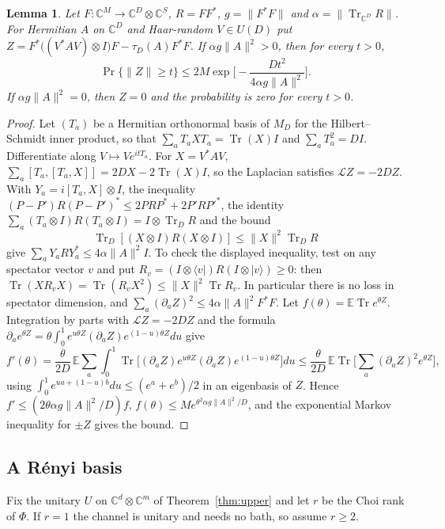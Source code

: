 \documentclass[11pt,a4paper]{article}
\theoremstyle{plain}
\newtheorem{lemma}[theorem]{Lemma}
\theoremstyle{definition}
\theoremstyle{remark}
\DeclareMathOperator{\Tr}{Tr}
\begin{document}
\begin{lemma}\label{lem:concentration}
Let $F:\mathbb{C}^{M}\to\mathbb{C}^D\otimes\mathbb{C}^S$, $R=FF^*$, $g=\|F^*F\|$ and $\alpha=\|\Tr_{\mathbb{C}^D}R\|$. For
Hermitian $A$ on $\mathbb{C}^D$ and Haar-random $V\in U(D)$ put
$Z=F^*\big((V^*AV)\otimes I\big)F-\tau_D(A)F^*F$. If $\alpha g\|A\|^2>0$, then for every $t>0$,
\[
\Pr\{\|Z\|\ge t\}\le2M\exp\!\Big[-\frac{Dt^2}{4\alpha g\|A\|^2}\Big].
\]
If $\alpha g\|A\|^2=0$, then $Z=0$ and the probability is zero for every $t>0$.
\end{lemma}

\begin{proof}
Let $(T_a)$ be a Hermitian orthonormal basis of $M_D$ for the Hilbert--Schmidt inner product, so that
$\sum_aT_aXT_a=\Tr(X)I$ and $\sum_aT_a^2=DI$. Differentiate along $V\mapsto Ve^{itT_a}$. For $X=V^*AV$,
$\sum_a[T_a,[T_a,X]]=2DX-2\Tr(X)I$, so the Laplacian satisfies $\mathcal{L}Z=-2DZ$. With $Y_a=i[T_a,X]\otimes I$, the
inequality $(P-P')R(P-P')^*\le2PRP^*+2P'RP'^*$, the identity $\sum_a(T_a\otimes I)R(T_a\otimes I)=I\otimes\Tr_DR$ and the
bound
\[
\Tr_D[(X\otimes I)R(X\otimes I)]\le\|X\|^2\Tr_D R
\]
give $\sum_aY_aRY_a^*\le4\alpha\|A\|^2I$. To check the displayed inequality, test on any spectator vector $v$ and put
$R_v=(I\otimes\langle v|)R(I\otimes|v\rangle)\ge0$: then $\Tr(XR_vX)=\Tr(R_vX^2)\le\|X\|^2\Tr R_v$.
In particular there is no loss in spectator dimension, and
$\sum_a(\partial_aZ)^2\le4\alpha\|A\|^2F^*F$. Let $f(\theta)=\mathbb{E}\Tr e^{\theta Z}$. Integration by parts with
$\mathcal{L}Z=-2DZ$ and the formula $\partial_ae^{\theta Z}=\theta\int_0^1e^{u\theta Z}(\partial_aZ)e^{(1-u)\theta Z}du$ give
\[
f'(\theta)=\frac{\theta}{2D}\,\mathbb{E}\sum_a\int_0^1\Tr\big[(\partial_aZ)e^{u\theta Z}(\partial_aZ)e^{(1-u)\theta Z}\big]du
\le\frac{\theta}{2D}\,\mathbb{E}\Tr\Big[\sum_a(\partial_aZ)^2e^{\theta Z}\Big],
\]
using $\int_0^1e^{ua+(1-u)b}du\le(e^a+e^b)/2$ in an eigenbasis of $Z$. Hence $f'\le(2\theta\alpha g\|A\|^2/D)f$,
$f(\theta)\le Me^{\theta^2\alpha g\|A\|^2/D}$, and the exponential Markov inequality for $\pm Z$ gives the bound.
\end{proof}

\subsection{A R\'enyi basis}

Fix the unitary $U$ on $\mathbb{C}^d\otimes\mathbb{C}^m$ of Theorem~\ref{thm:upper} and let $r$ be the Choi rank of $\Phi$. If $r=1$
the channel is unitary and needs no bath, so assume $r\ge2$.
\end{document}
